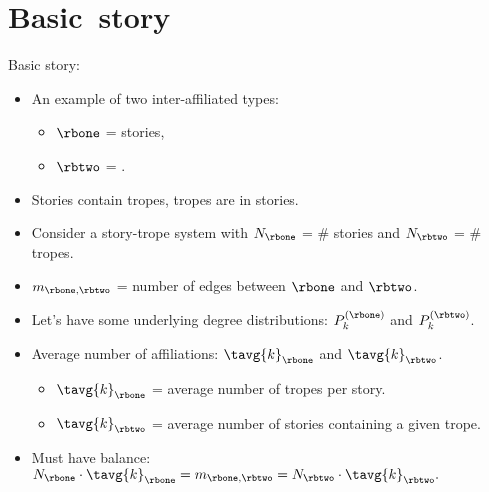 \section{Basic\ story}


\begin{frame}

  \begin{block}{Basic story:}
    \begin{itemize}
    \item<+->
      An example of two inter-affiliated types:
      \begin{itemize}
      \item<+->
        $\rbone$ = stories, 
      \item<+->
        $\rbtwo$ = .
      \end{itemize}
    \item<+->
      Stories contain tropes, tropes are in stories.
    \item<+->
      Consider a story-trope system with $N_{\rbone}$ = \# stories and $N_{\rbtwo}$ = \# tropes.
    \item<+->
      $m_{\rbone,\rbtwo}$ = number of edges between $\rbone$ and $\rbtwo$.
    \item<+->
      Let's have some underlying degree distributions:
      $P^{(\rbone)}_{k}$
      and
      $P^{(\rbtwo)}_{k}$.
    \item<+->
      Average number of affiliations:
      $\tavg{k}_{\rbone}$ and $\tavg{k}_{\rbtwo}$.
      \begin{itemize}
      \item<+->
        $\tavg{k}_{\rbone}$ = average number of tropes per story.
      \item<+->
        $\tavg{k}_{\rbtwo}$ = average number of stories containing a given trope.
      \end{itemize}
    \item<+->
      Must have balance:
      $
      N_{\rbone} \cdot \tavg{k}_{\rbone}
      =
      m_{\rbone,\rbtwo}
      =
      N_{\rbtwo} \cdot \tavg{k}_{\rbtwo}.
      $
    \end{itemize}
  \end{block}
  
\end{frame}

